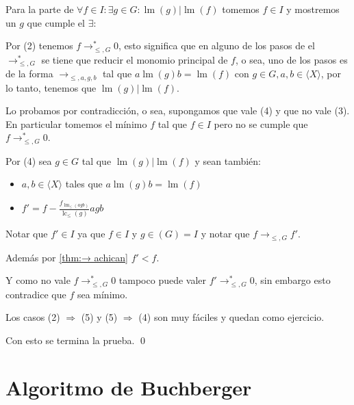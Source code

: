 \documentclass{amsbook} %
\theoremstyle{customstyle}
\renewenvironment{proof}[1][\proofname]{{\bfseries #1: }}{\qed} %
\theoremstyle{factstyle}
\DeclareMathOperator{\lm}{lm}
\DeclareMathOperator{\lc}{lc}
\begin{document}
\begin{proof}
\begin{description}
Para la parte de $∀f ∈ I : ∃g ∈ G : \lm(g) | \lm(f)$ tomemos $f ∈ I$ y mostremos un $g$ que cumple el $∃$:

Por (2) tenemos $f →^*_{≤, G} 0$, esto significa que en alguno de los pasos de el $→^*_{≤, G}$ se tiene que reducir el monomio principal de $f$, o sea, uno de los pasos es de la forma $→_{≤, a, g, b}$ tal que $a \lm(g) b = \lm(f)$ con $g ∈ G, a, b ∈ ⟨X⟩$, por lo tanto, tenemos que $\lm(g) | \lm(f)$.

\item[(4) $⇒$ (3)] Lo probamos por contradicción, o sea, supongamos que vale (4) y que no vale (3). En particular tomemos el mínimo $f$ tal que $f ∈ I$ pero no se cumple que $f →^*_{≤, G} 0$.

Por (4) sea $g ∈ G$ tal que $\lm(g) | \lm(f)$ y sean también:
\begin{itemize}
\item $a, b ∈ ⟨X⟩$ tales que $a \lm(g) b = \lm(f)$
\item $f' = f - \frac{f_{\lm_≤(agb)}}{\lc_≤(g)}agb$
\end{itemize}

Notar que $f' ∈ I$ ya que $f ∈ I$ y $g ∈ (G) = I$ y notar que $f →_{≤, G} f'$.

Además por \cref{thm:→ achican} $f' < f$.

Y como no vale $f →^*_{≤, G} 0$ tampoco puede valer $f' →^*_{≤, G} 0$, sin embargo esto contradice que $f$ sea mínimo.

\item Los casos (2) $⇒$ (5) y (5) $⇒$ (4) son muy fáciles y quedan como ejercicio. %

\end{description}
Con esto se termina la prueba.
\end{proof}


\section{Algoritmo de Buchberger}
\end{document}

